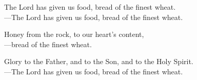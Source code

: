 \responsory

\noindent The Lord has given us food, bread of the finest wheat.\\
{\color{red}---\thinspace}The Lord has given us food, bread of the finest wheat.

\medskip\noindent Honey from the rock, to our heart’s content,\\
{\color{red}---\thinspace}bread of the finest wheat.

\medskip\noindent Glory to the Father, and to the Son, and to the Holy Spirit.\\
{\color{red}---\thinspace}The Lord has given us food, bread of the finest wheat.